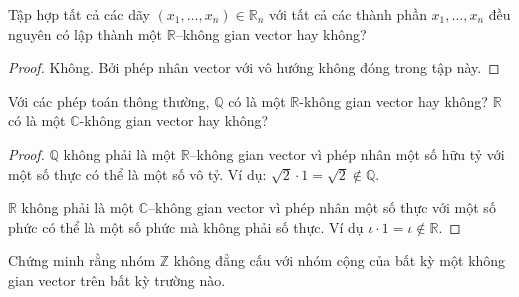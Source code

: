 \begin{exercise}
    Tập hợp tất cả các dãy $(x_{1},\ldots, x_{n})\in\mathbb{R}_{n}$ với tất cả các thành phần $x_{1}, \ldots, x_{n}$ đều nguyên có lập thành một $\mathbb{R}$--không gian vector hay không?
\end{exercise}

\begin{proof}
    Không. Bởi phép nhân vector với vô hướng không đóng trong tập này.
\end{proof}

\begin{exercise}
    Với các phép toán thông thường, $\mathbb{Q}$ có là một $\mathbb{R}$-không gian vector hay không? $\mathbb{R}$ có là một $\mathbb{C}$-không gian vector hay không?
\end{exercise}

\begin{proof}
    $\mathbb{Q}$ không phải là một $\mathbb{R}$--không gian vector vì phép nhân một số hữu tỷ với một số thực có thể là một số vô tỷ. Ví dụ: $\sqrt{2}\cdot 1 = \sqrt{2}\not\in\mathbb{Q}$.
    
    $\mathbb{R}$ không phải là một $\mathbb{C}$--không gian vector vì phép nhân một số thực với một số phức có thể là một số phức mà không phải số thực. Ví dụ $\iota\cdot 1 = \iota\not\in\mathbb{R}$.
\end{proof}

\begin{exercise}
    Chứng minh rằng nhóm $\mathbb{Z}$ không đẳng cấu với nhóm cộng của bất kỳ một không gian vector trên bất kỳ trường nào.
\end{exercise}


